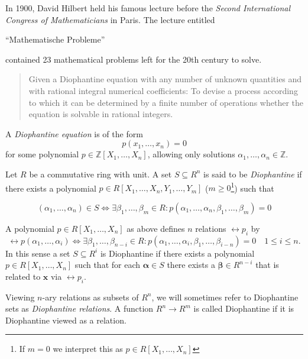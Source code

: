 
In 1900, David Hilbert held his famous lecture before the \emph{Second International Congress of Mathematicians} in Paris.
The lecture entitled \begin{german}\enquote{Mathematische Probleme}\end{german} contained 23 mathematical problems left for the 20th century to solve.


\begin{quotation}
    Given a Diophantine equation with any number of unknown quantities and with rational integral numerical coefficients: To devise a process according to which it can be determined by a finite number of operations whether the equation is solvable in rational integers.
\end{quotation}

A \emph{Diophantine equation} is of the form
%
\[ p(x_1, …, x_n) = 0 \]
%
for some polynomial $p ∈ ℤ[X_1, …, X_n]$, allowing only solutions $α_1,…,α_n ∈ ℤ$.


\begin{defin}
    Let $R$ be a commutative ring with unit.
    A set $S \subseteq R^n$ is said to be \emph{Diophantine} if there exists a polynomial $p ∈ R[X_1,…,X_n, Y_1,…,Y_m]$ ($m ≥ 0$\footnote{If $m = 0$ we interpret this as $p ∈ R[X_1,…,X_n]$}) such that

    \[ (α_1,…,α_n) ∈ S \Leftrightarrow ∃ β_1,…,β_m ∈ R: p(α_1,…,α_n,β_1,…,β_m) = 0 \]
\end{defin}

A polynomial $p ∈ R[X_1, …, X_n]$ as above defines $n$ relations $\rel{p}_i$ by
\[
  \rel{p}(α_1, …, α_i)  \Leftrightarrow
   ∃ β_1, …, β_{n - i} ∈ R : p(α_1, …, α_i, β_1, …, β_{i - n}) = 0 \quad
   1 ≤ i ≤ n.
\]
In this sense a set $S \subseteq R^i$ is Diophantine if there exists a
polynomial $p ∈ R[X_1, …, X_n]$ such that for each $\mathbf α ∈ S$ there exists
a $\mathbf β ∈ R^{n - i}$ that is related to $\mathbf x$ via $\rel p_i$.

Viewing $n$-ary relations as subsets of $R^n$, we will sometimes refer to
Diophantine sets as \emph{Diophantine relations}. A function $R^n → R^m$ is
called Diophantine if it is Diophantine viewed as a relation.

